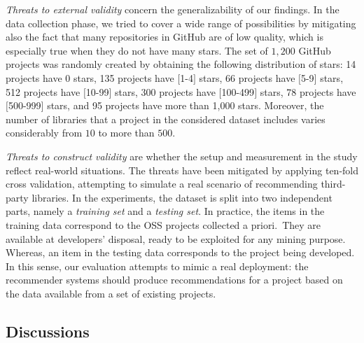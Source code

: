 \noindent\textit{Threats to external validity} concern the 
generalizability of our findings. In the data collection phase, we tried to 
cover a wide range of possibilities by mitigating also the fact that  many 
repositories in GitHub are of low quality, which is especially true when they 
do not have many stars. The set of  $1,200$ GitHub projects was 
randomly created by obtaining the following distribution of stars: 14 projects 
have 0 stars, 135 projects have $[$1-4$]$ stars, 66 projects have $[$5-9$]$ 
stars, 512 projects have $[$10-99$]$ stars, 300 projects have $[$100-499$]$ 
stars, 78 projects have $[$500-999$]$ stars, and 95 projects have more than 
1,000 stars. Moreover, the number of libraries that a project in the considered dataset 
includes varies considerably from $10$ to more than $500$. 


%

\noindent\textit{Threats to construct validity} are whether the setup and measurement in the study reflect real-world 
situations. The threats have been mitigated by applying ten-fold cross validation, attempting to simulate a real 
scenario of recommending third-party libraries. In the experiments, the dataset is split into two independent parts, 
namely a \emph{training set} and a \emph{testing set}. In practice, the items in the training data correspond to the 
OSS projects collected a priori.~They are available at developers' disposal, ready to be exploited for any mining 
purpose. Whereas, an item in the testing data corresponds to the project being developed. In this sense, our evaluation 
attempts to mimic a real deployment: the recommender systems should produce recommendations for a project based on the 
data available from a set of existing projects.

%
%
\subsection{Discussions} \label{sec:Discussions}

